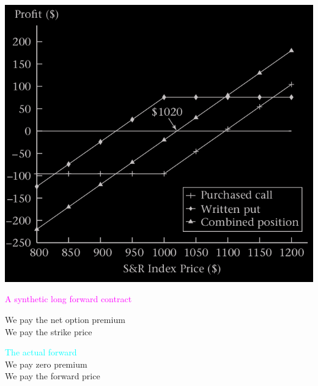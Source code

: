 \begin{frame}[fragile,t]
	\begin{mysol}
		\begin{center}
			\includegraphics[scale=0.25]{figs/Figure-3-6.png}
		\end{center}
		\myEnd
	\end{mysol}
\end{frame}
\begin{frame}[fragile,t]
	\begin{center}

		\textcolor{magenta}{A synthetic long forward contract}\\
		\bigskip

		We pay the net option premium\\[1em]
		We pay the strike price

		\bigskip
		\mySeparateLine
		\bigskip

		\textcolor{cyan}{The actual forward} \\
		\bigskip
		We pay zero premium \\[1em]
		We pay the forward price

\end{center}
\end{frame}
